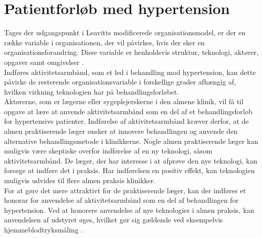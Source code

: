 \section{Patientforløb med hypertension}
Tages der udgangspunkt i Leavitts modificerede organisationsmodel, er der en række variable i organisationen, der vil påvirkes, hvis der sker en organisationsforandring. Disse variable er henholdsvis struktur, teknologi, aktører, opgaver samt omgivelser \citep{mtvhaandbog}. \\
Indføres aktivitetsarmbånd, som et led i behandling mod hypertension, kan dette påvirke de resterende organisationsvariable i forskellige grader afhængig af, hvilken virkning teknologien har på behandlingsforløbet. \\
Aktørerne, som er lægerne eller sygeplejerskerne i den almene klinik, vil få til opgave at lære at anvende aktivitetsarmbånd som en del af et behandlingsforløb for hypertensive patienter. Indførelse af aktivitetsarmbånd kræver derfor, at de almen praktiserende læger ønsker at innovere behandlingen og anvende den alternative behandlingsmetode i klinikkerne. Nogle almen praktiserende læger kan muligvis være skeptiske overfor indførelse af en ny teknologi, såsom aktivitetsarmbånd. De læger, der har interesse i at afprøve den nye teknologi, kan forsøge at indføre det i praksis. Har indførelsen en positiv effekt, kan teknologien muligvis udvides til flere almen praksis klinikker. \\
For at gøre det mere attraktivt for de praktiserende læger, kan der indføres et honorar for anvendelse af aktivitetsarmbånd som en del af behandlingen for hypertension. Ved at honorere anvendelse af nye teknologier i almen praksis, kan anvendelsen af udstyret øges, hvilket gør sig gældende ved eksempelvis hjemmeblodtryksmåling \citep{bang2006}.

